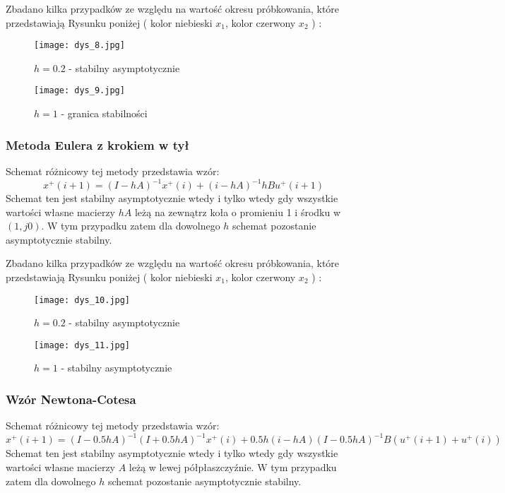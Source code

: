 \documentclass[a4paper,11pt]{article}
\begin{document}
Zbadano kilka przypadków ze względu na wartość okresu próbkowania, które przedstawiają Rysunku poniżej ( kolor niebieski \( x_{1} \), kolor czerwony \(x_{2}\) ) : 
\begin{figure}[!htb]
  \texttt{[image: dys\_8.jpg]}
  \caption{\(h=0.2\) - stabilny asymptotycznie }\label{fig:dys_8}
\endminipage\hfill
{}

  \texttt{[image: dys\_9.jpg]}
  \caption{\(h=1\) - granica stabilności}\label{dys_9}

\endminipage
\end{figure}

\subsubsection{Metoda Eulera z krokiem w tył}
Schemat różnicowy tej metody przedstawia wzór:
\begin{equation*}
x^{+}(i+1)=(I-hA)^{-1}x^{+}(i)+(i-hA)^{-1}hBu^{+}(i+1)
\end{equation*}
Schemat ten jest stabilny asymptotycznie wtedy i tylko wtedy gdy wszystkie wartości własne macierzy \( hA \) leżą na zewnątrz koła o promieniu 1 i środku w \( (1, j0) \). W tym przypadku zatem dla dowolnego \( h \) schemat pozostanie asymptotycznie stabilny. 

Zbadano kilka przypadków ze względu na wartość okresu próbkowania, które przedstawiają Rysunku poniżej ( kolor niebieski \( x_{1} \), kolor czerwony \(x_{2}\) ) : 
\begin{figure}[!htb]
  \texttt{[image: dys\_10.jpg]}
  \caption{\(h=0.2\) - stabilny asymptotycznie }\label{fig:dys_10}
\endminipage\hfill
{}

  \texttt{[image: dys\_11.jpg]}
  \caption{\(h=1\) - stabilny asymptotycznie}\label{fig:dys_11}

\endminipage
\end{figure}

\subsubsection{Wzór Newtona-Cotesa}
Schemat różnicowy tej metody przedstawia wzór:
\begin{equation*}
x^{+}(i+1)=(I-0.5hA)^{-1}(I+0.5hA)^{-1}x^{+}(i) +0.5h(i-hA)(I-0.5hA)^{-1}B(u^{+}(i+1)+u^{+}(i))
\end{equation*}
Schemat ten jest stabilny asymptotycznie wtedy i tylko wtedy gdy wszystkie wartości własne macierzy \( A \) leżą w lewej półpłaszczyźnie.
W tym przypadku zatem dla dowolnego \( h \) schemat pozostanie asymptotycznie stabilny. 
\end{document}
